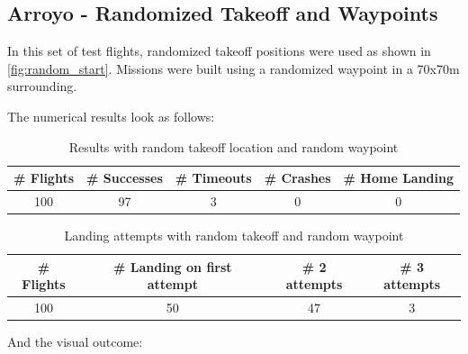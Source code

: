 \subsection{Arroyo - Randomized Takeoff and Waypoints}

    In this set of test flights, randomized takeoff positions were used as shown in \cref{fig:random_start}. Missions were built using a randomized waypoint in a 70x70m surrounding.

    The numerical results look as follows:

    \begin{table}[h]
        \begin{center}
         \caption{Results with random takeoff location and random waypoint}\vspace{1ex}
         \label{tab:result_complete_rand}
         \begin{tabular}{|c|c|c|c|c|}
         \hline
         \# Flights & \# Successes & \# Timeouts & \# Crashes & \# Home Landing\\ \hline \hline
         100 & 97 & 3 & 0 & 0 \\%
         \hline
         \end{tabular}
        \end{center}
    \end{table}
    \begin{table}[h]
        \begin{center}
         \caption{Landing attempts with random takeoff and random waypoint}\vspace{1ex}
         \label{tab:land_nums_complete_rand}
         \begin{tabular}{|c|c|c|c|}
         \hline
         \# Flights & \# Landing on first attempt & \# 2 attempts & \# 3 attempts\\ \hline \hline
         100 & 50 & 47 & 3 \\%
         \hline
         \end{tabular}
        \end{center}
    \end{table}

    And the visual outcome:


